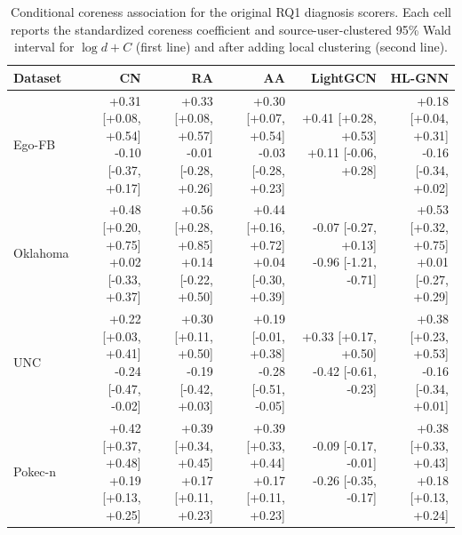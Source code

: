 \begin{table}[t]
\centering
\scriptsize
\setlength{\tabcolsep}{2.5pt}
\caption{Conditional coreness association for the original RQ1 diagnosis scorers. Each cell reports the standardized coreness coefficient and source-user-clustered 95\% Wald interval for $\log d+C$ (first line) and after adding local clustering (second line).}
\label{tab:rq1-diagnosis-conditional-hit}
\begin{tabular}{lrrrrr}
\toprule
Dataset & CN & RA & AA & LightGCN & HL-GNN \\
\midrule
Ego-FB & \shortstack{+0.31 [+0.08, +0.54]\\-0.10 [-0.37, +0.17]} & \shortstack{+0.33 [+0.08, +0.57]\\-0.01 [-0.28, +0.26]} & \shortstack{+0.30 [+0.07, +0.54]\\-0.03 [-0.28, +0.23]} & \shortstack{+0.41 [+0.28, +0.53]\\+0.11 [-0.06, +0.28]} & \shortstack{+0.18 [+0.04, +0.31]\\-0.16 [-0.34, +0.02]} \\
Oklahoma & \shortstack{+0.48 [+0.20, +0.75]\\+0.02 [-0.33, +0.37]} & \shortstack{+0.56 [+0.28, +0.85]\\+0.14 [-0.22, +0.50]} & \shortstack{+0.44 [+0.16, +0.72]\\+0.04 [-0.30, +0.39]} & \shortstack{-0.07 [-0.27, +0.13]\\-0.96 [-1.21, -0.71]} & \shortstack{+0.53 [+0.32, +0.75]\\+0.01 [-0.27, +0.29]} \\
UNC & \shortstack{+0.22 [+0.03, +0.41]\\-0.24 [-0.47, -0.02]} & \shortstack{+0.30 [+0.11, +0.50]\\-0.19 [-0.42, +0.03]} & \shortstack{+0.19 [-0.01, +0.38]\\-0.28 [-0.51, -0.05]} & \shortstack{+0.33 [+0.17, +0.50]\\-0.42 [-0.61, -0.23]} & \shortstack{+0.38 [+0.23, +0.53]\\-0.16 [-0.34, +0.01]} \\
Pokec-n & \shortstack{+0.42 [+0.37, +0.48]\\+0.19 [+0.13, +0.25]} & \shortstack{+0.39 [+0.34, +0.45]\\+0.17 [+0.11, +0.23]} & \shortstack{+0.39 [+0.33, +0.44]\\+0.17 [+0.11, +0.23]} & \shortstack{-0.09 [-0.17, -0.01]\\-0.26 [-0.35, -0.17]} & \shortstack{+0.38 [+0.33, +0.43]\\+0.18 [+0.13, +0.24]} \\

\end{tabular}
\end{table}

